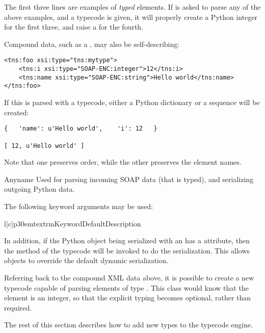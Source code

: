 The first three lines are examples of \emph{typed} elements.
If \ZSI{} is asked to parse any of the above examples, and a
 typecode is given, it will properly create a Python
integer for the first three, and raise a 
for the fourth.

Compound data, such as a , may also be self-describing:
\begin{verbatim}
<tns:foo xsi:type="tns:mytype">
    <tns:i xsi:type="SOAP-ENC:integer">12</tns:i>
    <tns:name xsi:type="SOAP-ENC:string">Hello world</tns:name>
</tns:foo>
\end{verbatim}

If this is parsed with a  typecode, either a Python dictionary
or a sequence will be created:
\begin{verbatim}
{   'name': u'Hello world',    'i': 12   }

[ 12, u'Hello world' ]
\end{verbatim}
Note that one preserves order, while the other preserves the element names.

\begin{classdesc}{Any}{name}
Used for parsing incoming SOAP data (that is typed), and serializing
outgoing Python data.

The following keyword arguments may be used:

\begin{tableiii}{l|c|p{30em}}{textrm}{Keyword}{Default}{Description}
\end{tableiii}

In addition, if the Python object being serialized with an 
has a  attribute, then the  method of
the typecode will be invoked to do the serialization.
This allows objects to override the default dynamic serialization.
\end{classdesc}

Referring back to the compound XML data above, it is possible to create a new
typecode capable of parsing elements of type .
This class would know that the  element is an integer,
so that the explicit typing becomes optional, rather than required.

The rest of this section describes how to add new
types to the \ZSI{} typecode engine.

